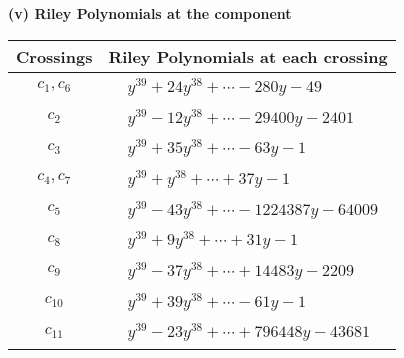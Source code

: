 \documentclass[1p]{elsarticle_modified}
\theoremstyle{definition}
\begin{document}
\newpage\renewcommand{\arraystretch}{1}
\flushleft \textbf{(v) Riley Polynomials at the component}\newline \\
\begin{tabular}{m{50pt}|m{274pt}}
Crossings & \hspace{64pt}Riley Polynomials at each crossing \\
\hline $$\begin{aligned}c_{1},c_{6}\end{aligned}$$&$\begin{aligned}
&y^{39}+24 y^{38}+\cdots-280 y-49
\end{aligned}$\\
\hline $$\begin{aligned}c_{2}\end{aligned}$$&$\begin{aligned}
&y^{39}-12 y^{38}+\cdots-29400 y-2401
\end{aligned}$\\
\hline $$\begin{aligned}c_{3}\end{aligned}$$&$\begin{aligned}
&y^{39}+35 y^{38}+\cdots-63 y-1
\end{aligned}$\\
\hline $$\begin{aligned}c_{4},c_{7}\end{aligned}$$&$\begin{aligned}
&y^{39}+y^{38}+\cdots+37 y-1
\end{aligned}$\\
\hline $$\begin{aligned}c_{5}\end{aligned}$$&$\begin{aligned}
&y^{39}-43 y^{38}+\cdots-1224387 y-64009
\end{aligned}$\\
\hline $$\begin{aligned}c_{8}\end{aligned}$$&$\begin{aligned}
&y^{39}+9 y^{38}+\cdots+31 y-1
\end{aligned}$\\
\hline $$\begin{aligned}c_{9}\end{aligned}$$&$\begin{aligned}
&y^{39}-37 y^{38}+\cdots+14483 y-2209
\end{aligned}$\\
\hline $$\begin{aligned}c_{10}\end{aligned}$$&$\begin{aligned}
&y^{39}+39 y^{38}+\cdots-61 y-1
\end{aligned}$\\
\hline $$\begin{aligned}c_{11}\end{aligned}$$&$\begin{aligned}
&y^{39}-23 y^{38}+\cdots+796448 y-43681
\end{aligned}$\\
\hline
\end{tabular}\\~\\
\end{document}
